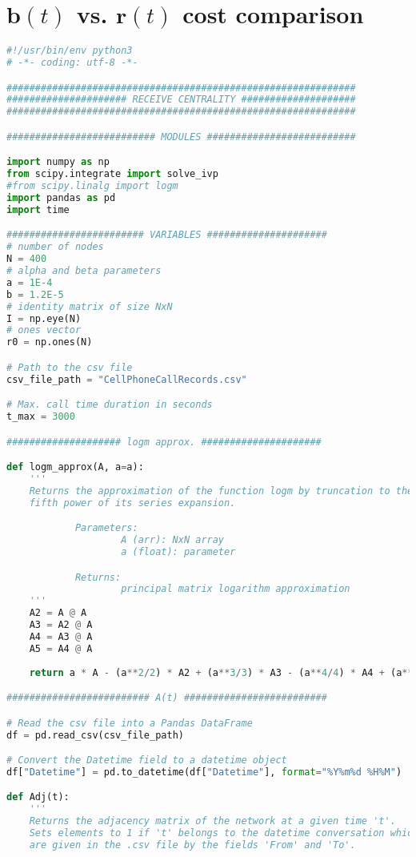 \section*{$\mathbf{b}(t)$ vs. $\mathbf{r}(t)$ cost comparison}
\label{sec:brc}
\begin{lstlisting}[language=Python, caption=$\mathbf{b}(t)$ vs. $\mathbf{r}(t)$ cost comparison]
#!/usr/bin/env python3
# -*- coding: utf-8 -*-

#############################################################
##################### RECEIVE CENTRALITY ####################
#############################################################

########################## MODULES ##########################

import numpy as np
from scipy.integrate import solve_ivp
#from scipy.linalg import logm
import pandas as pd
import time

######################## VARIABLES #####################
# number of nodes
N = 400 
# alpha and beta parameters
a = 1E-4
b = 1.2E-5
# identity matrix of size NxN
I = np.eye(N)
# ones vector
r0 = np.ones(N)

# Path to the csv file
csv_file_path = "CellPhoneCallRecords.csv"

# Max. call time duration in seconds
t_max = 3000

#################### logm approx. #####################

def logm_approx(A, a=a):
    '''
    Returns the approximation of the function logm by truncation to the 
    fifth power of its series expansion.

            Parameters:
                    A (arr): NxN array 
                    a (float): parameter

            Returns:
                    principal matrix logarithm approximation 
    '''
    A2 = A @ A
    A3 = A2 @ A
    A4 = A3 @ A
    A5 = A4 @ A
    
    return a * A - (a**2/2) * A2 + (a**3/3) * A3 - (a**4/4) * A4 + (a**5/5) * A5

######################### A(t) #########################

# Read the csv file into a Pandas DataFrame
df = pd.read_csv(csv_file_path)

# Convert the Datetime field to a datetime object
df["Datetime"] = pd.to_datetime(df["Datetime"], format="%Y%m%d %H%M")

def Adj(t):
    '''
    Returns the adjacency matrix of the network at a given time 't'. 
    Sets elements to 1 if 't' belongs to the datetime conversation which nodes
    are given in the .csv file by the fields 'From' and 'To'.


\end{lstlisting}
